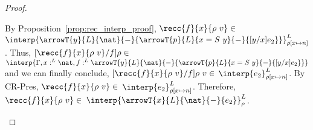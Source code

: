 \begin{proof}
\begin{itemize}
  By Proposition~\ref{prop:rec_interp_proof}, $\recc{f}{x}{\rho\ v}
  \in $ $\interp{\arrowT{y}{L}{\nat}{-}{\arrowT{p}{L}{x =
  S\ y}{-}{[y/x]e_2}}}^L_{\rho[x \mapsto n]}$.  Thus,
  $[\recc{f}{x}{\rho\ v}/f]\rho \in $ $\interp{\Gamma,x:^L
  \nat,f:^L \arrowT{y}{L}{\nat}{-}{\arrowT{p}{L}{x =
  S\ y}{-}{[y/x]e_2}}}$ and we can finally conclude,
  $[\recc{f}{x}{\rho\ v}/f]\rho\ v \in $
  $\interp{e_2}^L_{\rho[x \mapsto n]}$.  By
  CR-Pres, $\recc{f}{x}{\rho\ v} \in $ $\interp{e_2}^L_{\rho[x \mapsto n]}$.  Therefore,
  $\recc{f}{x}{\rho\ v} \in $
  $\interp{\arrowT{x}{L}{\nat}{-}{e_2}}^L_\rho$.
\end{itemize}
\end{proof}
